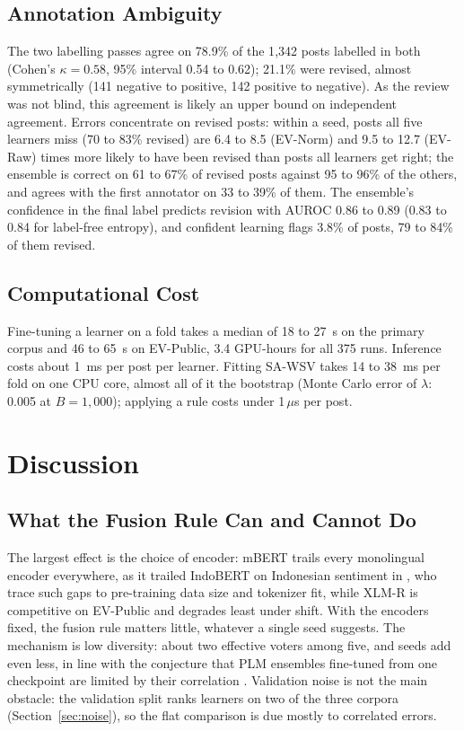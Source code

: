 \documentclass[conference,a4paper]{IEEEtran}
\newcommand{\rc}{SA\mbox{-}WSV}
\begin{document}
\subsection{Annotation Ambiguity}
The two labelling passes agree on 78.9\% of the 1{,}342 posts labelled in both (Cohen's $\kappa=0.58$, 95\% interval 0.54 to 0.62); 21.1\% were revised, almost symmetrically (141 negative to positive, 142 positive to negative). As the review was not blind, this agreement is likely an upper bound on independent agreement. Errors concentrate on revised posts: within a seed, posts all five learners miss (70 to 83\% revised) are 6.4 to 8.5 (EV-Norm) and 9.5 to 12.7 (EV-Raw) times more likely to have been revised than posts all learners get right; the ensemble is correct on 61 to 67\% of revised posts against 95 to 96\% of the others, and agrees with the first annotator on 33 to 39\% of them. The ensemble's confidence in the final label predicts revision with AUROC 0.86 to 0.89 (0.83 to 0.84 for label-free entropy), and confident learning \cite{northcutt2021} flags 3.8\% of posts, 79 to 84\% of them revised.

\subsection{Computational Cost}
Fine-tuning a learner on a fold takes a median of 18 to 27~s on the primary corpus and 46 to 65~s on EV-Public, 3.4 GPU-hours for all 375 runs. Inference costs about 1~ms per post per learner. Fitting \rc{} takes 14 to 38~ms per fold on one CPU core, almost all of it the bootstrap (Monte Carlo error of $\lambda$: 0.005 at $B=1{,}000$); applying a rule costs under 1\,$\mu$s per post.

\section{Discussion}

\subsection{What the Fusion Rule Can and Cannot Do}
The largest effect is the choice of encoder: mBERT trails every monolingual encoder everywhere, as it trailed IndoBERT on Indonesian sentiment in \cite{rust2021}, who trace such gaps to pre-training data size and tokenizer fit, while XLM-R is competitive on EV-Public and degrades least under shift. With the encoders fixed, the fusion rule matters little, whatever a single seed suggests. The mechanism is low diversity: about two effective voters among five, and seeds add even less, in line with the conjecture that PLM ensembles fine-tuned from one checkpoint are limited by their correlation \cite{xiao2022}. Validation noise is not the main obstacle: the validation split ranks learners on two of the three corpora (Section~\ref{sec:noise}), so the flat comparison is due mostly to correlated errors.
\end{document}
